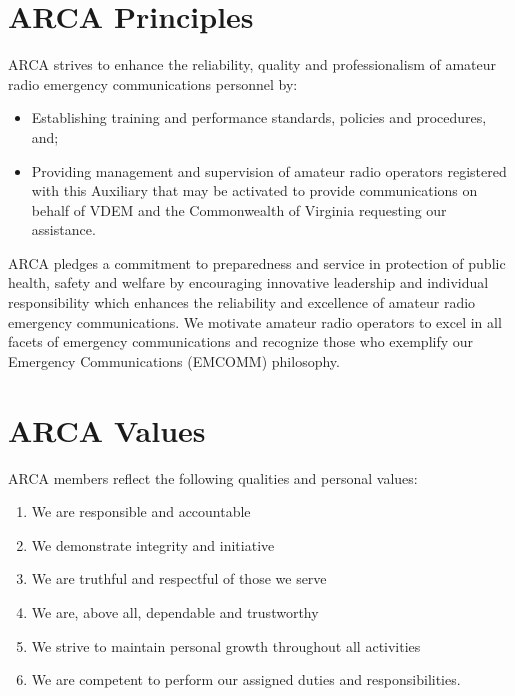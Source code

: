 \documentclass[pdflatex,letterpaper,twoside,12pt]{book}
\begin{document}

\section{ARCA Principles}

ARCA strives to enhance the reliability, quality and professionalism of amateur radio emergency communications personnel by:

\begin{itemize}
	\item Establishing training and performance standards, policies and procedures, and;
	\item Providing management and supervision of amateur radio operators registered with this Auxiliary that may be activated to provide communications on behalf of VDEM and the Commonwealth of Virginia requesting our assistance.
\end{itemize}

ARCA pledges a commitment to preparedness and service in protection of public health, safety and welfare by encouraging innovative leadership and individual responsibility which enhances the reliability and excellence of amateur radio emergency communications. We motivate amateur radio operators to excel in all facets of emergency communications and recognize those who exemplify our Emergency Communications (EMCOMM) philosophy.


\section{ARCA Values}

ARCA members reflect the following qualities and personal values:

\begin{enumerate}
	\item We are responsible and accountable
	\item We demonstrate integrity and initiative
	\item We are truthful and respectful of those we serve
	\item We are, above all, dependable and trustworthy
	\item We strive to maintain personal growth throughout all activities
	\item We are competent to perform our assigned duties and responsibilities.
\end{enumerate}
\end{document}

